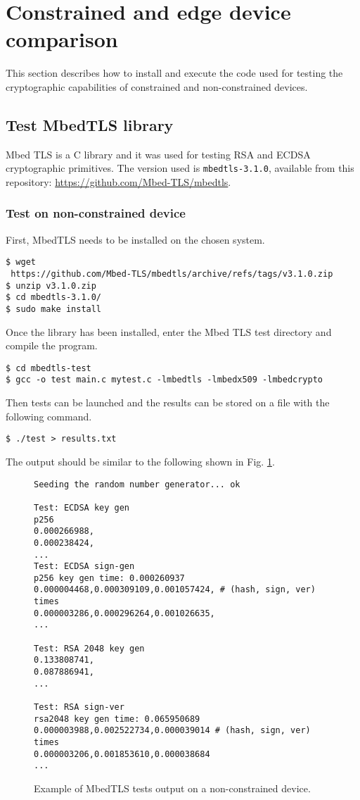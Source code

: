 
\section{Constrained and edge device comparison}
This section describes how to install and execute the code used for testing the cryptographic capabilities of constrained and non-constrained devices.
\subsection{Test MbedTLS library}
Mbed TLS \cite{mbed-tls} is a C library and it was used for testing RSA and ECDSA cryptographic primitives. The version used is \texttt{mbedtls-3.1.0}, available from this repository: \url{https://github.com/Mbed-TLS/mbedtls}. 

\subsubsection{Test on non-constrained device}
First, MbedTLS needs to be installed on the chosen system. \\
\begin{lstlisting}[style=terminal,frame=single]
$ wget 
 https://github.com/Mbed-TLS/mbedtls/archive/refs/tags/v3.1.0.zip
$ unzip v3.1.0.zip
$ cd mbedtls-3.1.0/
$ sudo make install
\end{lstlisting}
Once the library has been installed, enter the Mbed TLS test directory and compile the program.  \\
\begin{lstlisting}[style=terminal,frame=single]
$ cd mbedtls-test
$ gcc -o test main.c mytest.c -lmbedtls -lmbedx509 -lmbedcrypto
\end{lstlisting}
Then tests can be launched and the results can be stored on a file with the following command. \\
\begin{lstlisting}[style=terminal,frame=single]
$ ./test > results.txt
\end{lstlisting}
The output should be similar to the following shown in Fig. \ref{l-mbedtls-1}. \\
\begin{figure}[H]
\begin{lstlisting}[frame=single]
Seeding the random number generator... ok

Test: ECDSA key gen
p256
0.000266988,
0.000238424,
...
Test: ECDSA sign-gen
p256 key gen time: 0.000260937
0.000004468,0.000309109,0.001057424, # (hash, sign, ver) times
0.000003286,0.000296264,0.001026635,
...

Test: RSA 2048 key gen
0.133808741,
0.087886941,
...

Test: RSA sign-ver
rsa2048 key gen time: 0.065950689
0.000003988,0.002522734,0.000039014 # (hash, sign, ver) times
0.000003206,0.001853610,0.000038684
...
\end{lstlisting}
\caption{Example of MbedTLS tests output on a non-constrained device. \label{l-mbedtls-1}}
\end{figure}
